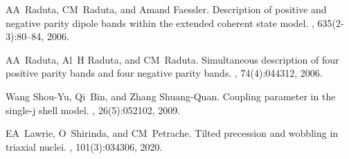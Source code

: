 \documentclass[11pt]{article}
\begin{document}
\begin{thebibliography}{99}
AA~Raduta, CM~Raduta, and Amand Faessler.
\newblock Description of positive and negative parity dipole bands within the
  extended coherent state model.
, 635(2-3):80--84, 2006.

AA~Raduta, Al~H Raduta, and CM~Raduta.
\newblock Simultaneous description of four positive parity bands and four
  negative parity bands.
, 74(4):044312, 2006.

Wang Shou-Yu, Qi~Bin, and Zhang Shuang-Quan.
\newblock Coupling parameter in the single-j shell model.
, 26(5):052102, 2009.

EA~Lawrie, O~Shirinda, and CM~Petrache.
\newblock Tilted precession and wobbling in triaxial nuclei.
, 101(3):034306, 2020.

\end{thebibliography}
\end{document}
